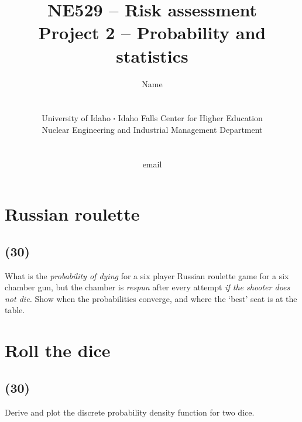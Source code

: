 \documentclass[11pt,a4paper]{article}
\newcommand*\sq{\mathbin{\vcenter{\hbox{\rule{.3ex}{.3ex}}}}} %
\begin{document}
\begin{titlepage}
    \title{
        NE529 -- Risk assessment\\
        Project 2 -- Probability and statistics\\
    }
    \author{
        Name
        \\ \\ \\
        University of Idaho $\sq$ Idaho Falls Center for Higher Education\\
        Nuclear Engineering and Industrial Management Department
        \\ \\ \\
        email 
    }
\clearpage %
\maketitle
\vspace*{\fill}
\thispagestyle{empty} %
\end{titlepage}

\printnoidxglossary

\newpage

\section{Russian roulette}
\subsection*{(30)}
What is the \textit{probability of dying} for a six player Russian roulette game for a six chamber gun, but the chamber is \textit{respun} after every attempt \textit{if the shooter does not die.} Show when the probabilities converge, and where the ‘best’ seat is at the table.





\newpage

\section{Roll the dice}
\subsection*{(30)}
Derive and plot the discrete probability density function for two dice.
\end{document}
